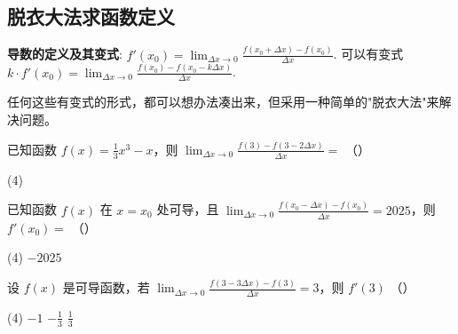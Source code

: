 \vspace{4em}

\subsection{脱衣大法求函数定义}

\begin{theorem}[脱衣大法]
    \textbf{导数的定义及其变式}:
    $f'(x_0) = \lim_{\Delta x \to 0}\frac{f(x_0 + \Delta x) - f(x_0)}{\Delta x}$.
    可以有变式 $k \cdot f'(x_0) = \lim_{\Delta x \to 0}\frac{f(x_0) - f(x_0 - k \Delta x)}{\Delta x}$.

    任何这些有变式的形式，都可以想办法凑出来，但采用一种简单的"脱衣大法"来解决问题。
\end{theorem}
\begin{example}
    已知函数 $f(x) = \frac{1}{3}x^{3} - x$，则 $\lim_{\Delta x \to 0}\frac{f(3) - f(3 - 2 \Delta x)}{\Delta x} =$ （\quad）
    \begin{tasks}(4)
           
    \end{tasks}
\end{example}

\vspace{4em}

\begin{example}
    已知函数 $f(x)$ 在 $x = x_{0}$ 处可导，且 $\lim_{\Delta x \to 0}\frac{f(x_{0} - \Delta x) - f(x_{0})}{\Delta x} = 2025$，则 $f'(x_{0}) =$ （\quad）
    \begin{tasks}(4)
        \task $- 2025$   
    \end{tasks}
\end{example}

\vspace{4em}

\begin{example}
    设 $f(x)$ 是可导函数，若 $\lim_{\Delta x \to 0}\frac{f(3 - 3\Delta x) - f(3)}{\Delta x} = 3$，则 $f'(3)$ （\quad）
    \begin{tasks}(4)
        \task $- 1$ \task $- \frac{1}{3}$ \task $\frac{1}{3}$ 
    \end{tasks}
\end{example}

\vspace{4em}